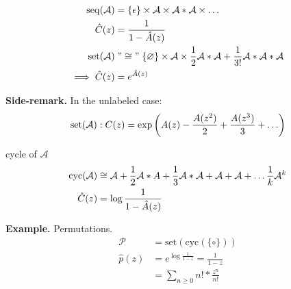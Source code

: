 \begin{align*}
    \operatorname{seq}(\mathcal{A}) &= \{\epsilon\} \times \mathcal{A} \times \mathcal{A}*\mathcal{A} \times \ldots \\
    \hat{C}(z) &= \frac{1}{1-\hat{A}(z)} \\
    \operatorname{set}(\mathcal{A}) &\mathrel{"\cong"} \{\varnothing\}
        \times \mathcal{A}
        \times \frac{1}{2}\mathcal{A} * \mathcal{A} + \frac{1}{3!}\mathcal{A}*\mathcal{A}*\mathcal{A} \\
        \implies \hat{C}(z) &= e^{\hat{A}(z)}
\end{align*}

\textbf{Side-remark.} In the unlabeled case:
\begin{align*}
  \operatorname{set}(\mathcal{A}): C(z) = \exp\left( A(z) - \frac{A(z^2)}{2} + \frac{A(z^3)}{3} + \ldots \right)
\end{align*}

cycle of $\mathcal{A}$
\begin{align*}
    \operatorname{cyc}(\mathcal{A}) &\cong \mathcal{A} + \frac{1}{2}\mathcal{A} * A + \frac{1}{3}\mathcal{A}*\mathcal{A} + \mathcal{A} + \mathcal{A} + \ldots \frac{1}{k}\mathcal{A}^k \\
    \hat{C}(z) &= \log\frac{1}{1-\hat{A}(z)}
\end{align*}

\textbf{Example.}
Permutations.
\begin{align*}
    \mathcal{P} &= \text{set}(\text{cyc}(\{ \circ \} )) \\
    \hat{p}(z) &= e^{\log \frac{1}{1-z}} = \frac{1}{1-z} \\
        &= \sum_{n\geq 0} n! * \frac{z^n}{n!}
\end{align*}
